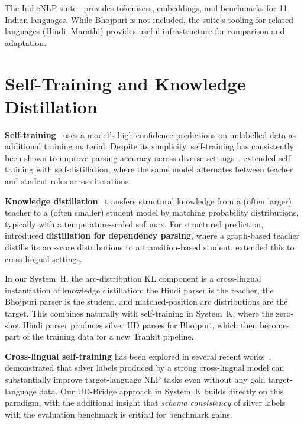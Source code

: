 \documentclass[12pt,a4paper,oneside]{report}
\begin{document}
The IndicNLP suite~\citep{kakwani2020indicnlpsuite} provides tokenisers,
embeddings, and benchmarks for 11 Indian languages. While Bhojpuri is not
included, the suite's tooling for related languages (Hindi, Marathi) provides
useful infrastructure for comparison and adaptation.

\section{Self-Training and Knowledge Distillation}

\textbf{Self-training}~\citep{mcclosky2006selftraining} uses a model's
high-confidence predictions on unlabelled data as additional training material.
Despite its simplicity, self-training has consistently been shown to improve
parsing accuracy across diverse settings~\citep{steedman2003boot,
sagae2010selftraining}. \citet{kumar2021selfdistill} extended self-training with
self-distillation, where the same model alternates between teacher and student
roles across iterations.

\textbf{Knowledge distillation}~\citep{hinton2015distilling} transfers structural
knowledge from a (often larger) teacher to a (often smaller) student model by
matching probability distributions, typically with a temperature-scaled softmax.
For structured prediction, \citet{kuncoro2016distilling} introduced
\textbf{distillation for dependency parsing}, where a graph-based teacher
distills its arc-score distributions to a transition-based student.
\citet{wang2020structuredkd} extended this to cross-lingual settings.

In our System~H, the arc-distribution KL component is a cross-lingual
instantiation of knowledge distillation: the Hindi parser is the teacher, the
Bhojpuri parser is the student, and matched-position arc distributions are the
target. This combines naturally with self-training in System~K, where the
zero-shot Hindi parser produces silver UD parses for Bhojpuri, which then
becomes part of the training data for a new Trankit pipeline.

\textbf{Cross-lingual self-training} has been explored in several recent
works~\citep{lin2020pretrained,gritta2022crossaug}. \citet{liu2022silvernlp}
demonstrated that silver labels produced by a strong cross-lingual model can
substantially improve target-language NLP tasks even without any gold
target-language data. Our UD-Bridge approach in System~K builds directly on
this paradigm, with the additional insight that \emph{schema consistency} of
silver labels with the evaluation benchmark is critical for benchmark gains.
\end{document}
